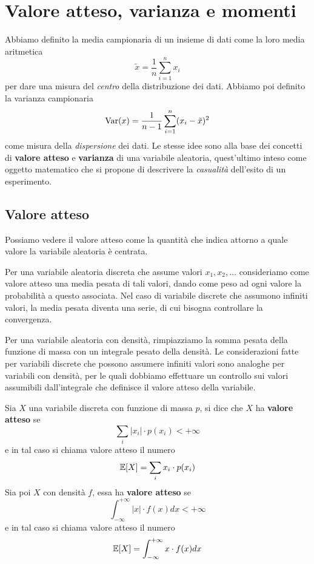 \section{Valore atteso, varianza e momenti}
Abbiamo definito la media campionaria di un insieme di dati come la loro media aritmetica
\[ \tilde{x} = \frac{1}{n} \sum_{i=1}^n x_i \]
per dare una misura del \emph{centro} della distribuzione dei dati. Abbiamo poi definito la
varianza campionaria
\[ \operatorname{Var}(x) = \frac{1}{n-1} \sum_{i=1}^n (x_i - \tilde{x})^2 \]
come misura della \emph{dispersione} dei dati. Le stesse idee sono alla base dei concetti di
\textbf{valore atteso} e \textbf{varianza} di una variabile aleatoria, quest'ultimo inteso come
oggetto matematico che si propone di descrivere la \emph{casualità} dell'esito di un esperimento.

\subsection{Valore atteso}
Possiamo vedere il valore atteso come la quantità che indica attorno a quale valore la variabile
aleatoria è centrata.

Per una variabile aleatoria discreta che assume valori $x_1, x_2, \dots$ consideriamo come valore
atteso una media pesata di tali valori, dando come peso ad ogni valore la probabilità a questo
associata. Nel caso di variabile discrete che assumono infiniti valori, la media pesata diventa
una serie, di cui bisogna controllare la convergenza.

Per una variabile aleatoria con densità, rimpiazziamo la somma pesata della funzione di massa con
un integrale pesato della densità. Le considerazioni fatte per variabili discrete che possono
assumere infiniti valori sono analoghe per variabili con densità, per le quali dobbiamo effettuare
un controllo sui valori assumibili dall'integrale che definisce il valore atteso della variabile.

\begin{definition}
	Sia $X$ una variabile discreta con funzione di massa $p$, si dice che $X$ ha
	\textbf{valore atteso} se
	\[ \sum_i |x_i| \cdot p(x_i) < +\infty \]
	e in tal caso si chiama valore atteso il numero
	\[ \mathbb{E}[X] = \sum_i x_i \cdot p(x_i) \]
	Sia poi $X$ con densità $f$, essa ha \textbf{valore atteso} se
	\[ \int_{-\infty}^{+\infty} |x| \cdot f(x) dx < +\infty \]
	e in tal caso si chiama valore atteso il numero
	\[ \mathbb{E}[X] = \int_{-\infty}^{+\infty} x \cdot f(x) dx \]
\end{definition}

